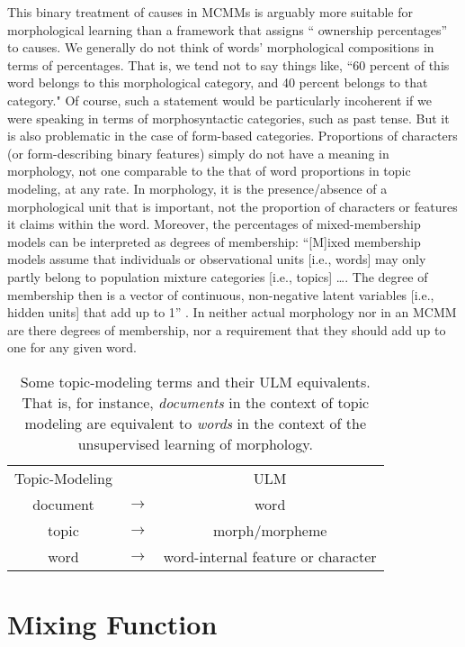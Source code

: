 This binary treatment of causes in MCMMs is arguably more suitable for 
morphological learning than a framework that assigns `` ownership percentages'' 
to causes.  We generally do not think of words' morphological compositions in 
terms of percentages.  That is, we tend not to say things like, ``60 percent 
of this word belongs to this morphological category, and 40 percent belongs 
to that category." Of course, such a statement would be particularly incoherent 
if we were speaking in terms of morphosyntactic categories, such as past tense. 
But it is also problematic in the case of form-based categories. Proportions 
of characters (or form-describing binary features) simply do not have a 
meaning in morphology, not one comparable to the that of word proportions 
in topic modeling, at any rate. In morphology, it is the presence/absence 
of a morphological unit that is important, not the proportion of characters 
or features it claims within the word. Moreover, the percentages of mixed-membership 
models can be interpreted as degrees of membership:  
``[M]ixed membership models assume that individuals or observational units 
[i.e., words] may only partly belong to population mixture categories [i.e., topics] \dots. 
The degree of membership then is a vector of continuous, 
non-negative latent variables [i.e., hidden units] that add up to 1'' \citep[][p. 4]{airoldi-et-al:2014}. 
In neither actual morphology nor in an MCMM are there degrees of membership, 
nor a requirement that they should add up to one for any given word. 

\begin{table}[htb]
\centering
\begin{tabular}{ccc}
Topic-Modeling & & ULM \\
document & $\to$ & word \\
topic & $\to$ & morph/morpheme \\
word & $\to$ & word-internal feature or character \\
\end{tabular}
\caption{Some topic-modeling terms and their ULM equivalents. That is, for instance, \emph{documents}
in the context of topic modeling are equivalent to \emph{words} in the context of the unsupervised learning
of morphology.}
\label{tab:tm-to-ulm}
\end{table}	

				
\section{Mixing Function}
\label{sec:mixing-function}

